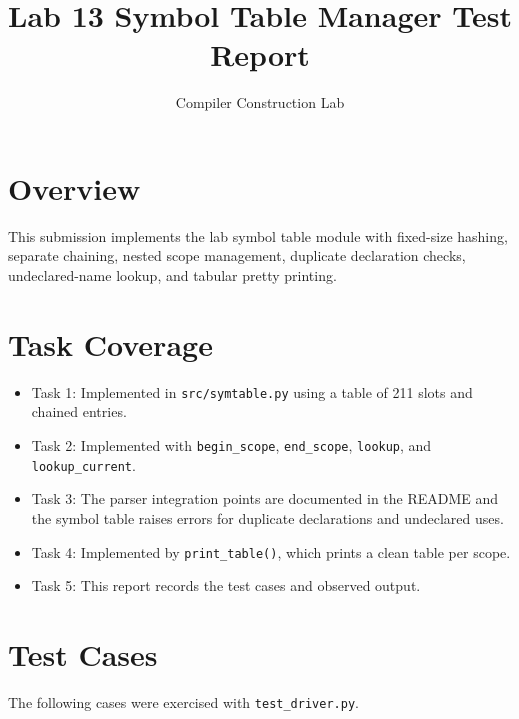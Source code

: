 \documentclass[11pt]{article}
\title{Lab 13 Symbol Table Manager Test Report}
\author{Compiler Construction Lab}
\date{}
\begin{document}
\maketitle

\section{Overview}
This submission implements the lab symbol table module with fixed-size hashing, separate chaining, nested scope management, duplicate declaration checks, undeclared-name lookup, and tabular pretty printing.

\section{Task Coverage}
\begin{itemize}[leftmargin=1.25em]
  \item Task 1: Implemented in \texttt{src/symtable.py} using a table of 211 slots and chained entries.
  \item Task 2: Implemented with \texttt{begin\_scope}, \texttt{end\_scope}, \texttt{lookup}, and \texttt{lookup\_current}.
  \item Task 3: The parser integration points are documented in the README and the symbol table raises errors for duplicate declarations and undeclared uses.
  \item Task 4: Implemented by \texttt{print\_table()}, which prints a clean table per scope.
  \item Task 5: This report records the test cases and observed output.
\end{itemize}

\section{Test Cases}
The following cases were exercised with \texttt{test\_driver.py}.
\end{document}
